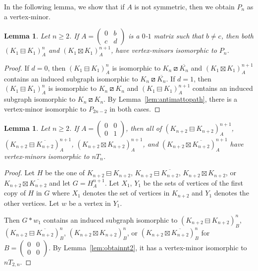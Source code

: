 \documentclass[11pt]{article}
\newtheorem{lemma}[theorem]{Lemma}
\newcommand\mat{\boxminus}
\newcommand\tri{\boxslash}
\newcommand\antimat{\boxtimes}
\def\K_#1{{K_{#1}}}
\def\S_#1{\overline{K_{#1}}}
\begin{document}
In the following lemma, 
  we 
  show that
  if $A$ is not symmetric, then we obtain $P_n$ as a vertex-minor.
\begin{lemma}\label{lem:notsymmetric}
  Let $n\ge 2$.
  If $A=(
  \begin{smallmatrix}
    0 & b \\c&d
  \end{smallmatrix})$
  is a $0$-$1$ matrix such that $b\neq c$,
  then 
  both $(\K_{1}\mat \K_{1})^n_A$
  and
  $(\K_{1}\antimat \K_{1})^{n+1}_A$,
  have vertex-minors isomorphic to $P_{n}$.
\end{lemma}
\begin{proof}
  If $d=0$, then $(\K_{1}\mat \K_{1})^n_A$ is isomorphic to $K_n\tri \S_n$
  and $(K_{1}\antimat K_{1})^{n+1}_A$ contains an induced subgraph
  isomorphic to $K_n\tri \S_n$.
  If $d=1$, then  $(\K_{1}\mat \K_{1})^{n}_A$ is isomorphic to $K_n\tri \K_n$
  and $(\K_{1}\mat \K_{1})^{n+1}_A$  contains an induced subgraph
  isomorphic to $K_n\tri \K_n$.
  By Lemma~\ref{lem:antimattopath}, there is a vertex-minor isomorphic to $P_{2n-2}$ in both cases. 
\end{proof}

	

\begin{lemma}\label{lem:simpledcm2}
  Let $n\ge 2$.
  If $A=(
  \begin{smallmatrix}
    0 & 0\\
    0 &1 
  \end{smallmatrix}
  )$, then
  all of $(K_{n+2}\mat K_{n+2})^{n+1}_A$,
  $(K_{n+2}\mat \S_{n+2})^{n+1}_A$,
  $(K_{n+2}\antimat K_{n+2})^{n+1}_A$,
  and 
  $(K_{n+2}\antimat \S_{n+2})^{n+1}_A$
  have vertex-minors isomorphic to $nT_n$.
	\end{lemma}
	\begin{proof}
          Let $H$ be the one of   $K_{n+2}\mat K_{n+2}$,
          $K_{n+2}\mat \S_{n+2}$,
          $K_{n+2}\antimat K_{n+2}$,
          or
          $K_{n+2}\antimat \S_{n+2}$
          and let $G=H^{n+1}_A$.
          Let $X_1$, $Y_1$ be the sets of vertices of the first copy of $H$ in $G$
          where $X_1$ denotes the set of vertices in $K_{n+2}$
          and $Y_1$ denotes the other vertices.
          Let $w$ be a vertex in $Y_1$.
          
          Then $G*w_1$ contains an induced subgraph isomorphic to
          $(K_{n+2}\mat K_{n+2})^{n}_B$,
          $(K_{n+2}\mat \S_{n+2})^{n}_B$,
          $(K_{n+2}\antimat K_{n+2})^{n}_B$,
          or 
          $(K_{n+2}\antimat \S_{n+2})^{n}_B$
          for $B=(
          \begin{smallmatrix}
            0&0\\0&0
          \end{smallmatrix})$.
          By Lemma~\ref{lem:obtainnt2}, it has a vertex-minor isomorphic to
          $nT_{2,n}$.
	\end{proof}
	
\end{document}
